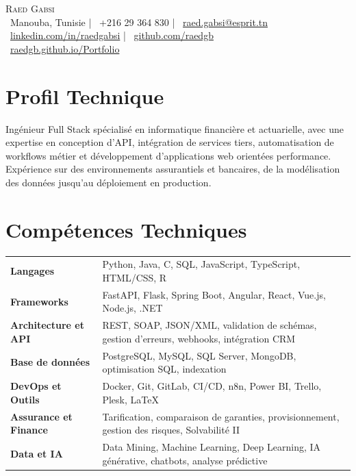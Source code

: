 \documentclass[10pt,a4paper]{article}
\begin{document}
\begin{center}
    {\Huge \textsc{Raed Gabsi}}\\[6pt]
    \faMapMarker* \ Manouba, Tunisie \quad | \quad
    \faPhone* \ +216 29 364 830 \quad | \quad
    \faEnvelope \ \href{mailto:raed.gabsi@esprit.tn}{raed.gabsi@esprit.tn}\\[3pt]
    \faLinkedin \ \href{https://linkedin.com/in/raedgabsi}{linkedin.com/in/raedgabsi} \quad | \quad
    \faGithub \ \href{https://github.com/raedgb}{github.com/raedgb}\\[3pt]
    \faGlobe \ \href{https://raedgb.github.io/Portfolio}{raedgb.github.io/Portfolio}
\end{center}

\section{Profil Technique}
Ingénieur Full Stack spécialisé en informatique financière et actuarielle, avec une expertise en conception d'API, intégration de services tiers, automatisation de workflows métier et développement d'applications web orientées performance. Expérience sur des environnements assurantiels et bancaires, de la modélisation des données jusqu'au déploiement en production.

\section{Compétences Techniques}
\begin{tabular}{@{}>{\bfseries}p{4.2cm}p{12.5cm}@{}}
Langages & Python, Java, C, SQL, JavaScript, TypeScript, HTML/CSS, R \\
Frameworks & FastAPI, Flask, Spring Boot, Angular, React, Vue.js, Node.js, .NET \\
Architecture et API & REST, SOAP, JSON/XML, validation de schémas, gestion d'erreurs, webhooks, intégration CRM \\
Base de données & PostgreSQL, MySQL, SQL Server, MongoDB, optimisation SQL, indexation \\
DevOps et Outils & Docker, Git, GitLab, CI/CD, n8n, Power BI, Trello, Plesk, \LaTeX \\
Assurance et Finance & Tarification, comparaison de garanties, provisionnement, gestion des risques, Solvabilité II \\
Data et IA & Data Mining, Machine Learning, Deep Learning, IA générative, chatbots, analyse prédictive \\
\end{tabular}
\end{document}
